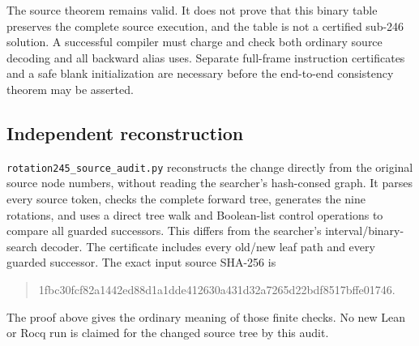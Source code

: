 The source theorem remains valid.  It does not prove that this binary
table preserves the complete source execution, and the table is not a
certified sub-246 solution.  A successful compiler must charge and check
both ordinary source decoding and all backward alias uses.  Separate
full-frame instruction certificates and a safe blank initialization are
necessary before the end-to-end consistency theorem may be asserted.

\subsection{Independent reconstruction}

\texttt{rotation245\_source\_audit.py} reconstructs the change directly
from the original source node numbers, without reading the searcher's
hash-consed graph.  It parses every source token, checks the complete
forward tree, generates the nine rotations, and uses a direct tree walk
and Boolean-list control operations to compare all guarded successors.
This differs from the searcher's interval/binary-search decoder.  The
certificate includes every old/new leaf path and every guarded successor.
The exact input source SHA-256 is
\begin{quote}\ttfamily\small
1fbc30fcf82a1442ed88d1a1dde412630a431d32a7265d22bdf8517bffe01746.
\end{quote}
The proof above gives the ordinary meaning of those finite checks.  No
new Lean or Rocq run is claimed for the changed source tree by this audit.
